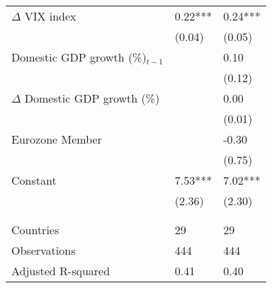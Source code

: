 {\begin{tabular}{lp{2cm}p{2cm}}
  $\Delta$ VIX index & 0.22*** & 0.24*** \\ 
   & (0.04) & (0.05) \\ 
  Domestic GDP growth (\%)$_{t-1}$ &  & 0.10 \\ 
   &  & (0.12) \\ 
  $\Delta$ Domestic GDP growth (\%) &  & 0.00 \\ 
   &  & (0.01) \\ 
  Eurozone Member &  & -0.30 \\ 
   &  & (0.75) \\ 
  Constant & 7.53*** & 7.02*** \\ 
   & (2.36) & (2.30) \\ 
   &  &  \\ 
   &  &  \\ 
  Countries & 29 & 29 \\ 
  Observations & 444 & 444 \\ 
  Adjusted R-squared & 0.41 & 0.40 \\ 
   \hline
\end{tabular}
}
